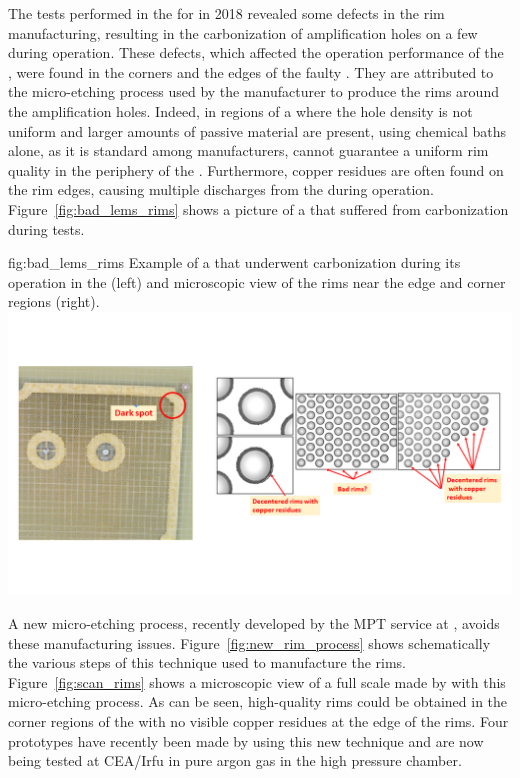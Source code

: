 The  tests performed in the \coldbox for  in 2018 revealed some defects in the  rim 
manufacturing, resulting in the carbonization of amplification holes on a few  during operation. These defects, which affected the operation performance of the , were found in the corners and the edges of the faulty . They are attributed to the micro-etching process used by the manufacturer to produce the rims around the amplification holes. Indeed, in regions of a  where the hole density is not uniform and larger amounts of passive material are present, using chemical baths alone, as it is standard among  manufacturers, cannot guarantee a uniform rim quality in the periphery of the . Furthermore, copper residues are often found on the rim edges, causing multiple discharges from the  during operation. Figure~\ref{fig:bad_lems_rims} shows a picture of a  that suffered from carbonization during \coldbox tests. 
\begin{dunefigure}
{fig:bad_lems_rims}
{Example of a  that underwent carbonization during its operation in the \coldbox (left) and microscopic view of the rims near the edge and corner regions (right).}
\includegraphics[width=1.0\textwidth]{graphics/BadRIMs1.png}
\end{dunefigure}
    
A new micro-etching process, recently developed by the MPT service at , avoids these manufacturing issues. Figure~\ref{fig:new_rim_process} shows schematically the various steps of this technique used to 
manufacture the  rims. Figure~\ref{fig:scan_rims} shows a microscopic view of a full scale  made by  with this micro-etching process. As can be seen, high-quality rims could be obtained in the corner regions of the  with no visible copper residues at the edge of the rims.
Four  prototypes have recently been made by  using this new technique and are now being tested at CEA/Irfu in pure argon gas in the high pressure chamber.

